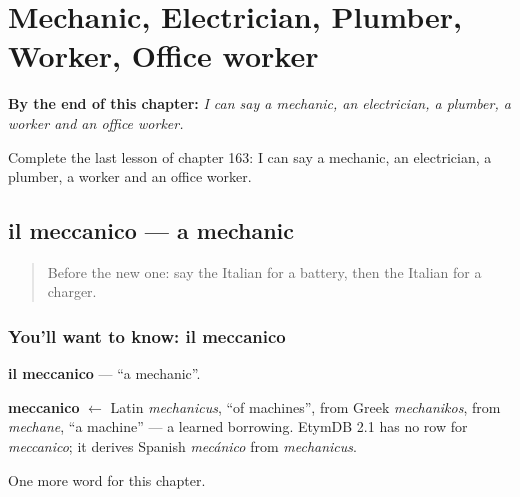
\chapter{Mechanic, Electrician, Plumber, Worker, Office worker}
\label{ch:it-mechanic-electrician-plumber-worker-office-worker}

\begin{chapteropening}
\textbf{By the end of this chapter:} \emph{I can say a mechanic, an electrician, a plumber, a worker and an office worker.}

Complete the last lesson of chapter 163: I can say a mechanic, an electrician, a plumber, a worker and an office worker.
\end{chapteropening}

\section[il meccanico]{il meccanico — a mechanic}

\label{lesson:IT-C163-meccanico}



\begin{quote}
Before the new one: say the Italian for a battery, then the Italian for a charger.
\end{quote}

\subsection*{You'll want to know: il meccanico}
\textbf{il meccanico} — \textquotedblleft{}a mechanic\textquotedblright{}.

\begin{cousinweb}
\textbf{meccanico} $\leftarrow$ Latin \emph{mechanicus}, \textquotedblleft{}of machines\textquotedblright{}, from Greek \emph{mechanikos}, from \emph{mechane}, \textquotedblleft{}a machine\textquotedblright{} — a learned borrowing. EtymDB 2.1 has no row for \emph{meccanico}; it derives Spanish \emph{mecánico} from \emph{mechanicus}.
\end{cousinweb}

\begin{grammarlens}[title={What you've built}]
One more word for this chapter.
\end{grammarlens}

